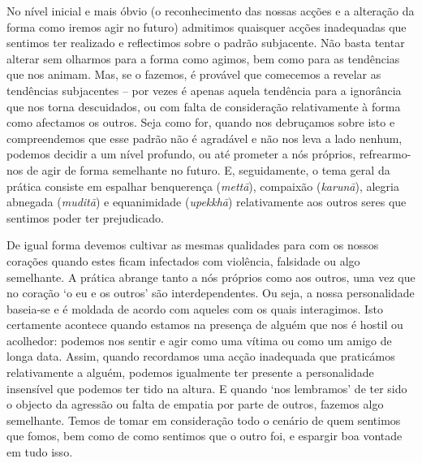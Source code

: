 No nível inicial e mais óbvio (o reconhecimento das nossas acções e a alteração da forma como iremos agir no futuro) admitimos quaisquer acções inadequadas que sentimos ter realizado e reflectimos sobre o padrão subjacente. Não basta tentar alterar sem olharmos para a forma como agimos, bem como para as tendências que nos animam. Mas, se o fazemos, é provável que comecemos a revelar as tendências subjacentes -- por vezes é apenas aquela tendência para a ignorância que nos torna descuidados, ou com falta de consideração relativamente à forma como afectamos os outros. Seja como for, quando nos debruçamos sobre isto e compreendemos que esse padrão não é agradável e não nos leva a lado nenhum, podemos decidir a um nível profundo, ou até prometer a nós próprios, refrearmo-nos de agir de forma semelhante no futuro. E, seguidamente, o tema geral da prática consiste em espalhar benquerença (\emph{mettā}), compaixão (\emph{karunā}), alegria abnegada (\emph{muditā}) e equanimidade (\emph{upekkhā}) relativamente aos outros seres que sentimos poder ter prejudicado.

De igual forma devemos cultivar as mesmas qualidades para com os nossos corações quando estes ficam infectados com violência, falsidade ou algo semelhante. A prática abrange tanto a nós próprios como aos outros, uma vez que no coração `o eu e os outros' são interdependentes. Ou seja, a nossa personalidade baseia-se e é moldada de acordo com aqueles com os quais interagimos. Isto certamente acontece quando estamos na presença de alguém que nos é hostil ou acolhedor: podemos nos sentir e agir como uma vítima ou como um amigo de longa data. Assim, quando recordamos uma acção inadequada que praticámos relativamente a alguém, podemos igualmente ter presente a personalidade insensível que podemos ter tido na altura. E quando `nos lembramos' de ter sido o objecto da agressão ou falta de empatia por parte de outros, fazemos algo semelhante. Temos de tomar em consideração todo o cenário de quem sentimos que fomos, bem como de como sentimos que o outro foi, e espargir boa vontade em tudo isso.


